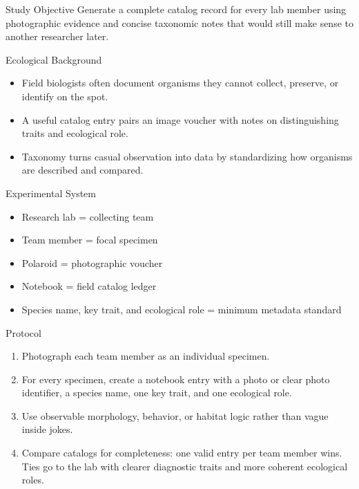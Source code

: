 \documentclass[10pt]{article}
\begin{document}
\begin{minipage}[t]{0.485\textwidth}
\vspace{0pt}
\begin{labbox}{Study Objective}
Generate a complete catalog record for every lab member using photographic evidence and concise taxonomic notes that would still make sense to another researcher later.
\end{labbox}

\begin{labbox}{Ecological Background}
\begin{itemize}
\item Field biologists often document organisms they cannot collect, preserve, or identify on the spot.
\item A useful catalog entry pairs an image voucher with notes on distinguishing traits and ecological role.
\item Taxonomy turns casual observation into data by standardizing how organisms are described and compared.
\end{itemize}
\end{labbox}

\begin{labbox}{Experimental System}
\begin{itemize}
\item Research lab = collecting team
\item Team member = focal specimen
\item Polaroid = photographic voucher
\item Notebook = field catalog ledger
\item Species name, key trait, and ecological role = minimum metadata standard
\end{itemize}
\end{labbox}

\begin{labbox}{Protocol}
\begin{enumerate}
\item Photograph each team member as an individual specimen.
\item For every specimen, create a notebook entry with a photo or clear photo identifier, a species name, one key trait, and one ecological role.
\item Use observable morphology, behavior, or habitat logic rather than vague inside jokes.
\item Compare catalogs for completeness: one valid entry per team member wins. Ties go to the lab with clearer diagnostic traits and more coherent ecological roles.
\end{enumerate}
\end{labbox}
\end{minipage}\hfill
\end{document}
